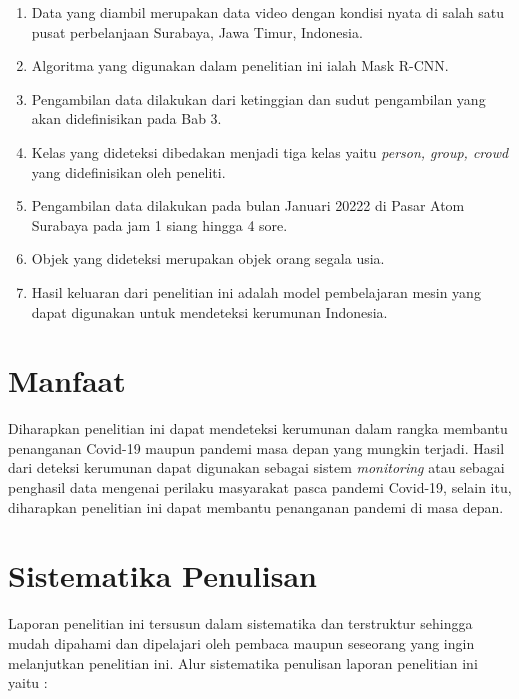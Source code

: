 \begin{enumerate}[itemsep=-0.2em]
      \item Data yang diambil merupakan data video dengan kondisi nyata di salah satu pusat
            perbelanjaan Surabaya, Jawa Timur, Indonesia.
      \item Algoritma yang digunakan dalam penelitian ini ialah Mask R-CNN.
      \item Pengambilan data dilakukan dari ketinggian dan sudut pengambilan yang akan didefinisikan pada Bab 3.
      \item Kelas yang dideteksi dibedakan menjadi tiga kelas yaitu \textit{person, group, crowd} yang didefinisikan oleh peneliti.
      \item Pengambilan data dilakukan pada bulan Januari 20222 di Pasar Atom Surabaya pada jam 1 siang hingga 4 sore.
      \item Objek yang dideteksi merupakan objek orang segala usia.
      \item Hasil keluaran dari penelitian ini adalah model pembelajaran mesin yang dapat digunakan untuk mendeteksi kerumunan Indonesia.

\end{enumerate}

\section{Manfaat}
Diharapkan penelitian ini dapat mendeteksi kerumunan dalam rangka membantu penanganan Covid-19 
maupun pandemi masa depan yang mungkin terjadi. Hasil dari deteksi kerumunan dapat digunakan sebagai
sistem \textit{monitoring} atau sebagai penghasil data mengenai perilaku masyarakat pasca pandemi Covid-19,
selain itu, diharapkan penelitian ini dapat membantu penanganan pandemi di masa depan.

\section{Sistematika Penulisan}

Laporan penelitian ini tersusun dalam sistematika dan terstruktur sehingga mudah
dipahami dan dipelajari oleh pembaca maupun seseorang yang ingin melanjutkan penelitian ini.
Alur sistematika penulisan laporan penelitian ini yaitu :

